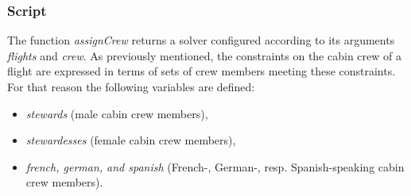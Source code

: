 \documentclass[a4paper,halfparskip]{scrartcl}
\begin{document}
\subsubsection{Script}
The function \emph{assignCrew} returns a solver configured according 
to its arguments \emph{flights} and \emph{crew}. As previously mentioned, 
the constraints on the cabin crew of a flight are expressed in 
terms of sets of crew members meeting these constraints. For 
that reason the following variables are defined: 
\begin{itemize}
\item
\emph{stewards} (male cabin crew members), 
\item
\emph{stewardesses} (female cabin crew members), 
\item
\emph{french, german, and spanish} 
(French-, German-, resp. Spanish-speaking cabin crew members). 
\end{itemize}
\end{document}
